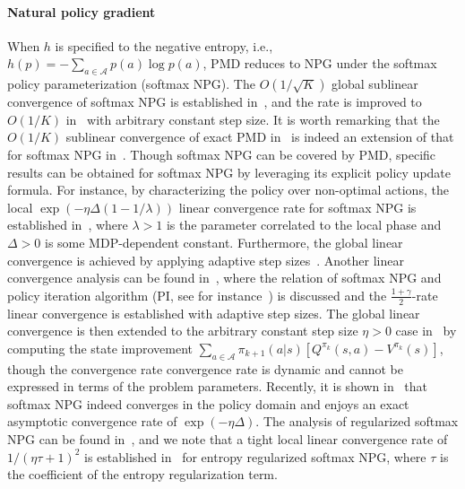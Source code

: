 \documentclass[10pt]{article}
\newcommand{\calA}{\mathcal{A}}
\theoremstyle{plain}
\theoremstyle{definition}
\begin{document}
\paragraph{Natural policy gradient}  When $h$ is specified to the negative entropy, i.e., $h(p) = -\sum_{a\in\calA} p(a) \log p(a)$, PMD reduces to NPG under the softmax policy parameterization (softmax NPG). The $O({1}/{\sqrt{K}})$ global sublinear convergence of softmax NPG is established in~\citet{Shani_Efroni_Mannor_2019}, and the rate is improved to $O({1}/{K})$ in~\citet{Agarwal_Kakade_Lee_Mahajan_2019} with arbitrary constant step size. It is worth remarking that the $O({1}/{K})$ sublinear convergence of exact PMD in~\citet{Xiao_2022} is indeed an extension of that for softmax NPG in~\citet{Agarwal_Kakade_Lee_Mahajan_2019}. Though softmax NPG can be covered by PMD, specific results can be obtained for softmax NPG by leveraging its explicit policy update formula. For instance, by characterizing the policy over non-optimal actions, the local $\exp(-\eta \Delta(1-1/\lambda) )$ linear convergence rate for softmax NPG is established in~\citet{Khodadadian_Jhunjhunwala_Varma_Maguluri_2021}, where $\lambda > 1$ is the parameter correlated to the local phase and $\Delta > 0$ is some MDP-dependent constant. Furthermore, the global linear convergence is achieved by applying  adaptive step sizes~\citep{Khodadadian_Jhunjhunwala_Varma_Maguluri_2021}. Another linear convergence analysis can be found in~\citet{Bhandari_Russo_2021}, where the relation of softmax NPG and policy iteration algorithm (PI, see for instance~\citet{suttonRL}) is discussed and the $\frac{1+\gamma}{2}$-rate linear convergence is established with  adaptive step sizes. The global linear convergence is then extended to the arbitrary constant step size $\eta > 0$ case in~\citet{pg-liu} by computing the state improvement $\sum_{a\in\calA} \pi_{k+1}(a|s) [Q^{\pi_k}(s,a) - V^{\pi_k}(s)]$, though the convergence rate convergence rate is dynamic and cannot be expressed in terms of the problem parameters. Recently, it is shown in~\citet{li2025phi} that softmax NPG indeed converges in the policy domain and enjoys an exact asymptotic convergence rate of $\exp(-\eta\Delta)$. The analysis of regularized softmax NPG can be found in~\citet{Shani_Efroni_Mannor_2019, Cen_Cheng_Chen_Wei_Chi_2022,pg-liu,cayci2024entropyNPG}, and we note that a tight local linear convergence rate of $1/(\eta\tau+1)^2$ is established in~\citet{pg-liu} for entropy regularized softmax NPG, where $\tau$ is the coefficient of the entropy regularization term.
\end{document}
